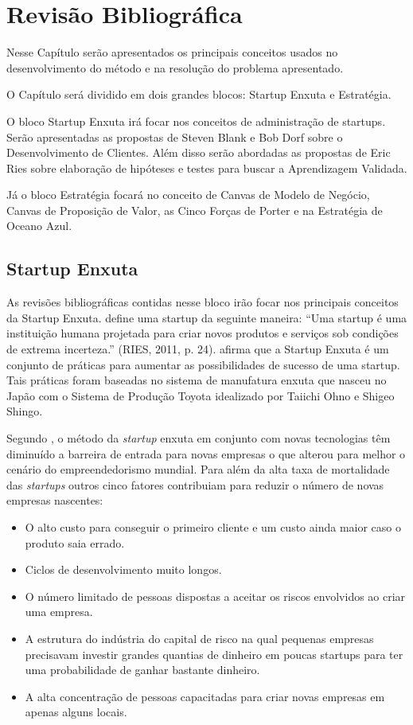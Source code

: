 \chapter[Revisão Bibliográfica]{Revisão Bibliográfica}
\label{chap:revisao}

Nesse Capítulo serão apresentados os principais conceitos usados no desenvolvimento do método e na resolução do problema apresentado.

O Capítulo será dividido em dois grandes blocos: Startup Enxuta e Estratégia.

O bloco Startup Enxuta irá focar nos conceitos de administração de startups. Serão apresentadas as propostas de Steven Blank e Bob Dorf sobre o Desenvolvimento de Clientes. Além disso serão abordadas as propostas de Eric Ries sobre elaboração de hipóteses e testes para buscar a Aprendizagem Validada.

Já o bloco Estratégia focará no conceito de Canvas de Modelo de Negócio, Canvas de Proposição de Valor, as Cinco Forças de Porter e na Estratégia de Oceano Azul.

\section{Startup Enxuta}
\label{cha:startupenxuta}
As revisões bibliográficas contidas nesse bloco irão focar nos principais conceitos da Startup Enxuta.  define uma startup da seguinte maneira: \enquote{Uma startup é uma instituição humana projetada para criar novos produtos e serviços sob condições de extrema incerteza.} (RIES, 2011, p. 24).  afirma que a Startup Enxuta é um conjunto de práticas para aumentar as possibilidades de sucesso de uma startup. Tais práticas foram baseadas no sistema de manufatura enxuta que nasceu no Japão com o Sistema de Produção Toyota idealizado por Taiichi Ohno e Shigeo Shingo.

Segundo , o método da \textit{startup} enxuta em conjunto com novas tecnologias têm diminuído a barreira de entrada para novas empresas o que alterou para melhor o cenário do empreendedorismo mundial. Para  além da alta taxa de mortalidade das \textit{startups} outros cinco fatores contribuiam para reduzir o número de novas empresas nascentes:
\begin{itemize}
\item O alto custo para conseguir o primeiro cliente e um custo ainda maior caso o produto saia errado.
\item Ciclos de desenvolvimento muito longos.
\item O número limitado de pessoas dispostas a aceitar os riscos envolvidos ao criar uma empresa.
\item A estrutura do indústria do capital de risco na qual pequenas empresas precisavam investir grandes quantias de dinheiro em poucas startups para ter uma probabilidade de ganhar bastante dinheiro.
\item A alta concentração de pessoas capacitadas para criar novas empresas em apenas alguns locais.
\end{itemize} 

